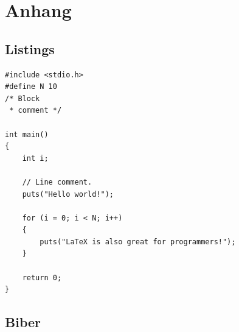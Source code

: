 \documentclass[12pt,DIV=15,BCOR=15mm,twoside,headsepline,abstract=true,listof=totoc,bibliography=totoc]{scrreprt}
\theoremstyle{remark}    %
\begin{document}
    \cleardoublepage



    \chapter{Anhang}


    \section{Listings}

    \lstset{language=C}
    \begin{lstlisting}[caption=C Code - direkt eingefügt, label=list:C]
#include <stdio.h>
#define N 10
/* Block
 * comment */

int main()
{
    int i;

    // Line comment.
    puts("Hello world!");
    
    for (i = 0; i < N; i++)
    {
        puts("LaTeX is also great for programmers!");
    }

    return 0;
}
    \end{lstlisting}




    \lstset{language=Java}


    
% 


    \section{Biber}
    \label{sec:biber}
    
\end{document}
